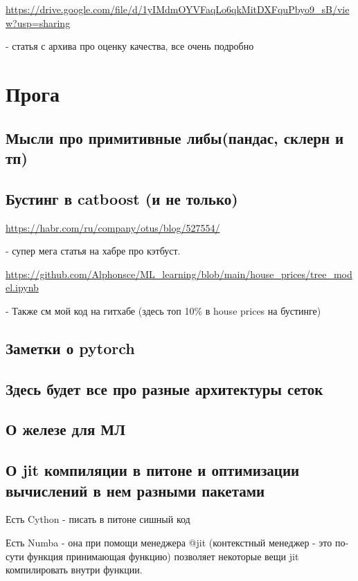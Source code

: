 \documentclass[11pt]{article}
\begin{document}
\url{https://drive.google.com/file/d/1yIMdmOYVFaqLo6qkMitDXFquPbyo9_sB/view?usp=sharing}

- статья с архива про оценку качества, все очень подробно

\section{Прога}

\subsection{Мысли про примитивные либы(пандас, склерн и тп)}

\subsection{Бустинг в catboost (и не только)}

\url{https://habr.com/ru/company/otus/blog/527554/}

- супер мега статья на хабре про кэтбуст.

\url{https://github.com/Alphonsce/ML_learning/blob/main/house_prices/tree_model.ipynb}

- Также см мой код на гитхабе (здесь топ 10\% в house prices на бустинге) 

\subsection{Заметки о pytorch}

\subsection{Здесь будет все про разные архитектуры сеток}

\subsection{О железе для МЛ}

\subsection{О jit компиляции в питоне и оптимизации вычислений в нем разными пакетами}

Есть Cython - писать в питоне сишный код

Есть Numba - она при помощи менеджера @jit (контекстный менеджер - это по-сути функция принимающая функцию) позволяет некоторые вещи jit компилировать внутри функции.
\end{document}
